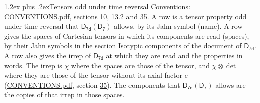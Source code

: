 \documentclass[10pt,a4paper]{article}
\makeatletter
\renewcommand\section{\@startsection{section}{1}{\z@}{-3ex plus -1ex minus -.2ex}%
  {1.2ex plus .2ex}{\normalfont\large\sffamily\bfseries\color{parttitle}}}
\numberwithin{equation}{section}
\newcommand{\grp}[1]{\mathsf{#1}}
\newcommand{\irrprod}{\otimes}
\makeatother
\begin{document}
\section{Tensors odd under time reversal}\label{s:time_odd}
Conventions: \href{../../CONVENTIONS.pdf}{CONVENTIONS.pdf}, sections \href{../../../rotation/CONVENTIONS.pdf\#conv.10}{10}, \href{../../../rotation/CONVENTIONS.pdf\#conv.13.2}{13.2} and \href{../../CONVENTIONS.pdf\#conv.35}{35}.
\leavevmode\label{n:head.name.property}A row is a tensor property odd under time reversal that $\grp{D_{7d}}(\grp{D_{7}})$ allows, by its Jahn symbol (name). \label{n:head.spaces}A row gives the spaces of Cartesian tensors in which its components are read (spaces), by their Jahn symbols in the section Isotypic components of the document of \href{../../../rotation/data/pdf/D7d.pdf}{$\grp{D_{7d}}$}. \label{n:head.properties}A row also gives the irrep of $\grp{D_{7d}}$ at which they are read and the properties in words. The irrep is $\chi$ where the spaces are those of the tensor, and $\chi \irrprod \det$ where they are those of the tensor without its axial factor e (\href{../../CONVENTIONS.pdf}{CONVENTIONS.pdf}, section \href{../../CONVENTIONS.pdf\#conv.35}{35}). The components that $\grp{D_{7d}}(\grp{D_{7}})$ allows are the copies of that irrep in those spaces.
\end{document}
